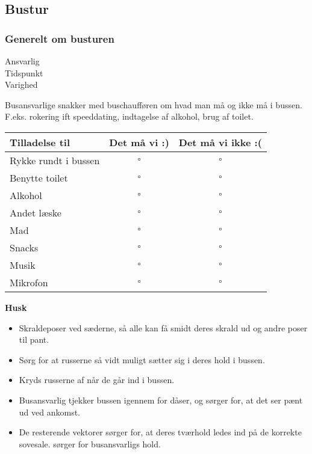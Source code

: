 \subsection{Bustur}

\subsubsection{Generelt om busturen}

\begin{description}
\item[Ansvarlig] \placeholder
\item[Tidspunkt] \placeholder
\item[Varighed] \placeholder
\end{description}

Busansvarlige snakker med buschaufføren om hvad man må og ikke må i bussen. F.eks. rokering ift speeddating, indtagelse af alkohol, brug af toilet.

\begin{table}[ht!]
\begin{center}
\begin{tabular}{|l|c|c|}
\hline
Tilladelse til          & \textbf{Det må vi :)} & \textbf{Det må vi ikke :(}\\ \hline
Rykke rundt i bussen    & $\square$             &  $\square$                \\ \hline
Benytte toilet          & $\square$             &  $\square$                \\ \hline
Alkohol                 & $\square$             &  $\square$                \\ \hline
Andet læske             & $\square$             &  $\square$                \\ \hline
Mad                     & $\square$             &  $\square$                \\ \hline
Snacks                  & $\square$             &  $\square$                \\ \hline
Musik                   & $\square$             &  $\square$                \\ \hline
Mikrofon                & $\square$             &  $\square$                \\ \hline
\end{tabular}
\end{center}
\end{table}

\textbf{Husk}
\begin{itemize}
    \item Skraldeposer ved sæderne, så alle kan få smidt deres skrald ud og andre poser til pant.
    \item Sørg for at russerne så vidt muligt sætter sig i deres hold i bussen.
    \item Kryds russerne af når de går ind i bussen.
    \item Busansvarlig tjekker bussen igennem for dåser, og sørger for, at det ser pænt ud ved ankomst.
    \item De resterende vektorer sørger for, at deres tværhold ledes ind på de korrekte sovesale. \VEKTOREKS sørger for busansvarligs hold.
\end{itemize}

